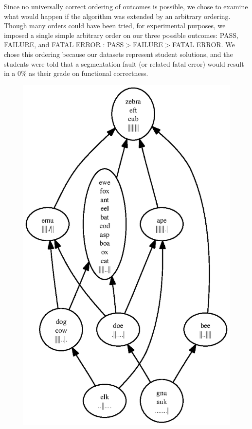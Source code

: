 \documentclass[11pt,twoside]{article}
\theoremstyle{definition}
\begin{document}
Since no universally correct ordering of outcomes is possible, we chose to examine what would happen if the algorithm was extended by an arbitrary ordering. Though many orders could have been tried, for experimental purposes, we imposed a single simple arbitrary order on our three possible outcomes: PASS, FAILURE, and FATAL ERROR : PASS$>$FAILURE$>$FATAL ERROR. We chose this ordering because our datasets represent student solutions, and the students were told that a segmentation fault (or related fatal error) would result in a 0\% as their grade on functional correctness.


\begin{figure}
\centering
\includegraphics[scale=0.75]{rank1.ps}

\end{figure}
\end{document}
